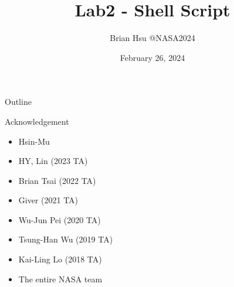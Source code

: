 \title{Lab2 - Shell Script}
\author{Brian Hsu @NASA2024}
\institute{}
\date{February 26, 2024}


\frame{\titlepage}
\begin{frame}{Outline}
\tableofcontents
\end{frame}






\begin{frame}{Acknowledgement}
\begin{itemize}
\item Hsin-Mu
\item HY, Lin (2023 TA)
\item Brian Tsai (2022 TA)
\item Giver (2021 TA)
\item Wu-Jun Pei (2020 TA)
\item Tsung-Han Wu (2019 TA)
\item Kai-Ling Lo (2018 TA)
\item The entire NASA team
\end{itemize}
\end{frame}


